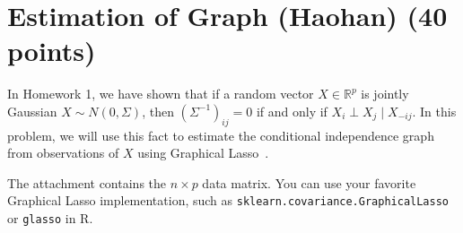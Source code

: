 \documentclass{article}
\begin{document}
\section{Estimation of Graph (Haohan) (40 points)} 



In Homework 1, we have shown that if a random vector $ X \in \mathbb{R}^{p} $ is jointly Gaussian $ X \sim N(0, \Sigma) $, then $ (\Sigma^{-1})_{ij} = 0 $ if and only if $ X_i \perp X_j \mid X_{-ij} $. 
In this problem, we will use this fact to estimate the conditional independence graph from observations of $ X $ using Graphical Lasso~\citep{friedman2008sparse}. 

The attachment contains the $ n \times p $ data matrix. 
You can use your favorite Graphical Lasso implementation, such as \texttt{sklearn.covariance.GraphicalLasso} or \texttt{glasso} in R. 
\end{document}
